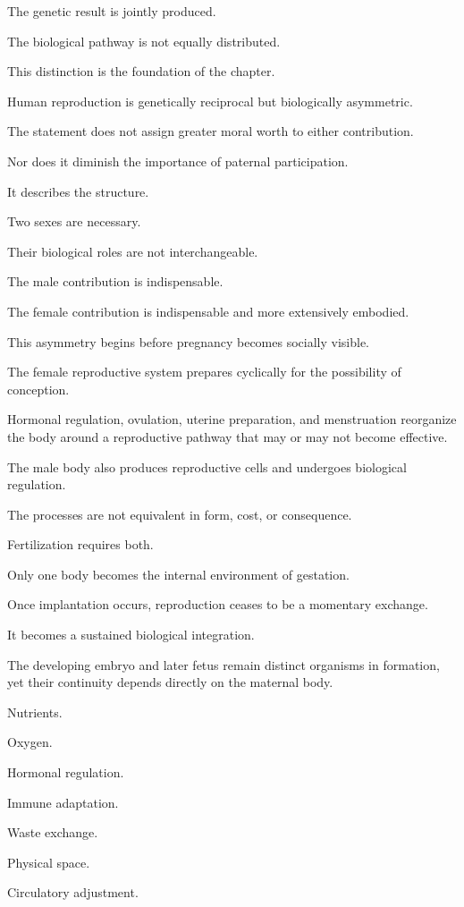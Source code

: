 The genetic result is jointly produced.

The biological pathway is not equally distributed.

This distinction is the foundation of the chapter.

Human reproduction is genetically reciprocal but biologically asymmetric.

The statement does not assign greater moral worth to either contribution.

Nor does it diminish the importance of paternal participation.

It describes the structure.

Two sexes are necessary.

Their biological roles are not interchangeable.

The male contribution is indispensable.

The female contribution is indispensable and more extensively embodied.

This asymmetry begins before pregnancy becomes socially visible.

The female reproductive system prepares cyclically for the possibility of conception.

Hormonal regulation, ovulation, uterine preparation, and menstruation reorganize the body around a reproductive pathway that may or may not become effective.

The male body also produces reproductive cells and undergoes biological regulation.

The processes are not equivalent in form, cost, or consequence.

Fertilization requires both.

Only one body becomes the internal environment of gestation.

Once implantation occurs, reproduction ceases to be a momentary exchange.

It becomes a sustained biological integration.

The developing embryo and later fetus remain distinct organisms in formation, yet their continuity depends directly on the maternal body.

Nutrients.

Oxygen.

Hormonal regulation.

Immune adaptation.

Waste exchange.

Physical space.

Circulatory adjustment.

